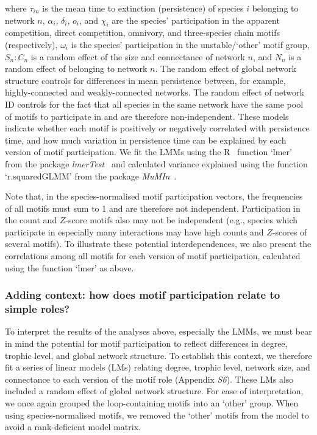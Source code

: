 \documentclass[12pt]{article}
\begin{document}
\begin{spacing}{2.0}
                where $\tau_{in}$ is the mean time to extinction (persistence) of species $i$ belonging to network $n$,  $\alpha_{i}$, $\delta_{i}$, $o_{i}$, and $\chi_{i}$ are the species' participation in the apparent competition, direct competition, omnivory, and three-species chain motifs (respectively), $\omega_{i}$ is the species' participation in the unstable/`other' motif group, $S_{n}:C_{n}$ is a random effect of the size and connectance of network $n$, and $N_n$ is a random effect of belonging to network $n$.
                The random effect of global network structure controls for differences in mean persistence between, for example, highly-connected and weakly-connected networks. 
                The random effect of network ID controls for the fact that all species in the same network have the same pool of motifs to participate in and are therefore non-independent.
                These models indicate whether each motif is positively or negatively correlated with persistence time, and how much variation in persistence time can be explained by each version of motif participation. 
                We fit the LMMs using the R~\citep{R} function `lmer' from the package \emph{lmerTest}~\citep{lmerTest} and calculated variance explained using the function `r.squaredGLMM' from the package \emph{MuMIn}~\citep{MuMIn}.
                
                
                Note that, in the species-normalised motif participation vectors, the frequencies of all motifs must sum to 1 and are therefore not independent. 
                Participation in the count and $Z$-score motifs also may not be independent (e.g., species which participate in especially many interactions may have high counts and $Z$-scores of several motifs).
                To illustrate these potential interdependences, we also present the correlations among all motifs for each version of motif participation, calculated using the function `lmer' as above.
                

        \subsubsection*{Adding context: how does motif participation relate to simple roles?}

            To interpret the results of the analyses above, especially the LMMs, we must bear in mind the potential for motif participation to reflect differences in degree, trophic level, and global network structure. 
            To establish this context, we therefore fit a series of linear models (LMs) relating degree, trophic level, network size, and connectance to each version of the motif role (Appendix \emph{S6}). 
            These LMs also included a random effect of global network structure.
            For ease of interpretation, we once again grouped the loop-containing motifs into an `other' group. 
            When using species-normalised motifs, we removed the `other' motifs from the model to avoid a rank-deficient model matrix.
            

\end{spacing}
\end{document}
